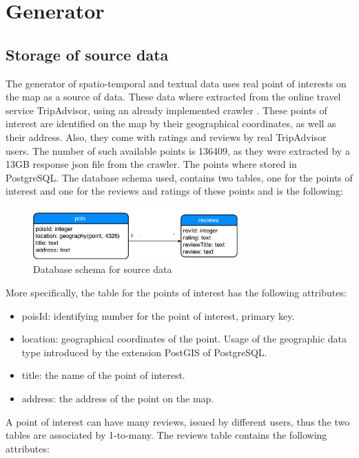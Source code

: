 \chapter{Generator}

\section{Storage of source data}

The generator of spatio-temporal and textual data uses real point of interests on the map as a source of data. These data where extracted from the online 
travel service TripAdvisor, using an already implemented crawler \cite{25}. These points of interest are identified on the map by their geographical coordinates, as 
well as their address. Also, they come with ratings and reviews by real TripAdvisor users. The number of such available points is 136409, as they were extracted by 
a 13GB response json file from the crawler. The points where stored in PostgreSQL. The database schema used, contains two tables, one for the points of interest 
and one for the reviews and ratings of these points and is the following:

\begin{figure}[H]
  \centering
  \includegraphics[width=0.7\textwidth]{figures/schema.png}
  \caption{Database schema for source data}
\end{figure}

More specifically, the table for the points of interest has the following attributes:

\begin{itemize}
 \item poisId: identifying number for the point of interest, primary key.
 \item location: geographical coordinates of the point. Usage of the geographic data type introduced by the extension PostGIS of PostgreSQL.
 \item title: the name of the point of interest.
 \item address: the address of the point on the map.
\end{itemize}

A point of interest can have many reviews, issued by different users, thus the two tables are associated by 1-to-many. The reviews table contains 
the following attributes:

